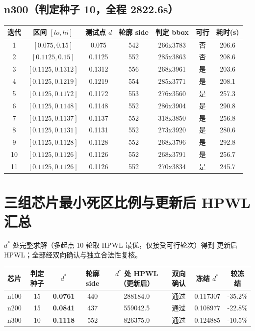 \documentclass[12pt,a4paper]{article}
\begin{document}
\subsection{n300（判定种子 10，全程 2822.6s）}
\begin{table}[H]
\centering
\scriptsize
\setlength{\tabcolsep}{2.5pt}
\begin{tabular}{ccccccc}
\toprule
迭代 & 区间 $[lo, hi]$ & 测试点 $d$ & 轮廓 side & 判定 bbox & 可行 & 耗时(s) \\
\midrule
1 & $[0.075,0.15]$ & 0.075 & 542 & 266x3783 & 否 & 206.6 \\
2 & $[0.1125,0.15]$ & 0.1125 & 552 & 285x3863 & 否 & 208.6 \\
3 & $[0.1125,0.1312]$ & 0.1312 & 556 & 268x3961 & 是 & 203.6 \\
4 & $[0.1125,0.1219]$ & 0.1219 & 554 & 285x3771 & 是 & 208.1 \\
5 & $[0.1125,0.1172]$ & 0.1172 & 553 & 276x3560 & 是 & 257.3 \\
6 & $[0.1125,0.1148]$ & 0.1148 & 552 & 286x3904 & 是 & 290.8 \\
7 & $[0.1125,0.1137]$ & 0.1137 & 552 & 318x3850 & 是 & 256.8 \\
8 & $[0.1125,0.1131]$ & 0.1131 & 552 & 273x3920 & 是 & 280.6 \\
9 & $[0.1125,0.1128]$ & 0.1128 & 552 & 268x3796 & 是 & 292.8 \\
10 & $[0.1125,0.1126]$ & 0.1126 & 552 & 268x3791 & 是 & 256.7 \\
11 & $[0.1125,0.1126]$ & 0.1126 & 552 & 270x3834 & 是 & 245.7 \\
\bottomrule
\end{tabular}
\end{table}

\section{三组芯片最小死区比例与更新后 HPWL 汇总}

$d^*$ 处完整求解（多起点 10 轮取 HPWL 最优，仅接受可行轮次）得到
更新后 HPWL；全部经双向确认与独立合法性复核。

\begin{table}[H]
\centering
\scriptsize
\setlength{\tabcolsep}{2.5pt}
\begin{tabular}{lccccccc}
\toprule
芯片 & 判定种子 & $d^*$ & 轮廓 side & $d^*$ 处 HPWL（更新后） & 双向确认 & 冻结 $d^*$ & 较冻结 \\
\midrule

n100 & 15 & \textbf{0.0761} & 440 & 288184.0 & 通过 & 0.117307 & -35.2\% \\
n200 & 15 & \textbf{0.0841} & 437 & 559042.5 & 通过 & 0.108977 & -22.8\% \\
n300 & 10 & \textbf{0.1118} & 552 & 826375.0 & 通过 & 0.124885 & -10.5\% \\
\bottomrule
\end{tabular}
\end{table}
\end{document}

